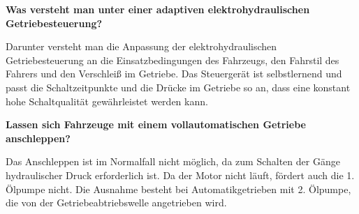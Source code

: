 \textbf{Was versteht man unter einer adaptiven elektrohydraulischen
Getriebesteuerung?}

Darunter versteht man die Anpassung der elektrohydraulischen
Getriebesteuerung an die Einsatzbedingungen des Fahrzeugs, den Fahrstil
des Fahrers und den Verschleiß im Getriebe. Das Steuergerät ist
selbstlernend und passt die Schaltzeitpunkte und die Drücke im Getriebe
so an, dass eine konstant hohe Schaltqualität gewährleistet werden kann.

\textbf{Lassen sich Fahrzeuge mit einem vollautomatischen Getriebe
anschleppen?}

Das Anschleppen ist im Normalfall nicht möglich, da zum Schalten der
Gänge hydraulischer Druck erforderlich ist. Da der Motor nicht läuft,
fördert auch die 1. Ölpumpe nicht. Die Ausnahme besteht bei
Automatikgetrieben mit 2. Ölpumpe, die von der Getriebeabtriebswelle
angetrieben wird.
